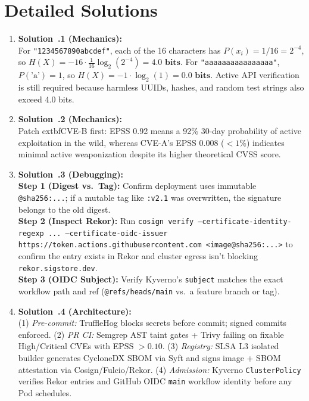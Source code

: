 \section{Detailed Solutions}
\begin{enumerate}[leftmargin=18pt]
  \item \textbf{Solution~\thechapter.1 (Mechanics):}\\
  For \texttt{"1234567890abcdef"}, each of the 16 characters has $P(x_i) = 1/16 = 2^{-4}$, so $H(X) = -16 \cdot \frac{1}{16} \log_2(2^{-4}) = \mathbf{4.0\text{ bits}}$. For \texttt{"aaaaaaaaaaaaaaaa"}, $P(\text{'a'}) = 1$, so $H(X) = -1 \cdot \log_2(1) = \mathbf{0.0\text{ bits}}$. Active API verification is still required because harmless UUIDs, hashes, and random test strings also exceed 4.0 bits.

  \item \textbf{Solution~\thechapter.2 (Mechanics):}\\
  Patch 	extbf{CVE-B} first: EPSS 0.92 means a 92\% 30-day probability of active exploitation in the wild, whereas CVE-A's EPSS 0.008 ($<1\%$) indicates minimal active weaponization despite its higher theoretical CVSS score.

  \item \textbf{Solution~\thechapter.3 (Debugging):}\\
  \textbf{Step 1 (Digest vs.\ Tag):} Confirm deployment uses immutable \texttt{@sha256:...}; if a mutable tag like \texttt{:v2.1} was overwritten, the signature belongs to the old digest.\\
  \textbf{Step 2 (Inspect Rekor):} Run \texttt{cosign verify --certificate-identity-regexp ... --certificate-oidc-issuer https://token.actions.githubusercontent.com <image@sha256:...>} to confirm the entry exists in Rekor and cluster egress isn't blocking \texttt{rekor.sigstore.dev}.\\
  \textbf{Step 3 (OIDC Subject):} Verify Kyverno's \texttt{subject} matches the exact workflow path and ref (\texttt{@refs/heads/main} vs.\ a feature branch or tag).

  \item \textbf{Solution~\thechapter.4 (Architecture):}\\
  (1) \emph{Pre-commit:} TruffleHog blocks secrets before commit; signed commits enforced. (2) \emph{PR CI:} Semgrep AST taint gates + Trivy failing on fixable High/Critical CVEs with EPSS $>0.10$. (3) \emph{Registry:} SLSA L3 isolated builder generates CycloneDX SBOM via Syft and signs image + SBOM attestation via Cosign/Fulcio/Rekor. (4) \emph{Admission:} Kyverno \texttt{ClusterPolicy} verifies Rekor entries and GitHub OIDC \texttt{main} workflow identity before any Pod schedules.


\end{enumerate}
